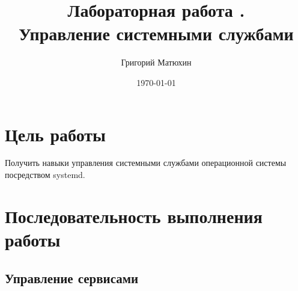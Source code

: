\documentclass[12pt]{article}
\author{Григорий Матюхин}
\date{\today}
\title{Лабораторная работа \textnumero5.\\Управление системными службами}
\begin{document}
\maketitle
\newpage
\tableofcontents
\newpage
\section{Цель работы}
Получить навыки управления системными службами операционной системы посредством systemd.
\section{Последовательность выполнения работы}

\subsection{Управление сервисами}
\end{document}

